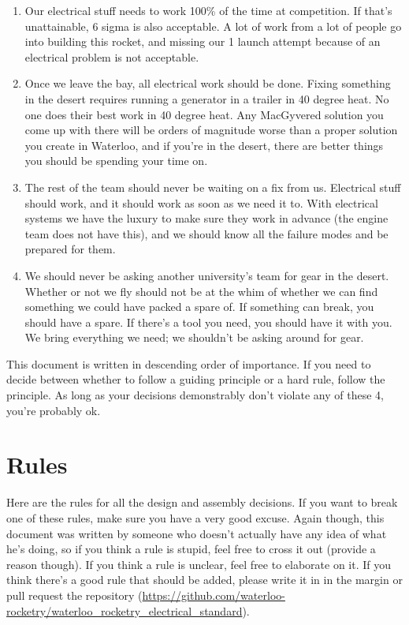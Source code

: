\documentclass{article}
\begin{document}
\begin{enumerate}
\item Our electrical stuff needs to work 100\% of the time at competition. If that's unattainable, 6 sigma is also acceptable. A lot of work from a lot of people go into building this rocket, and missing our 1 launch attempt because of an electrical problem is not acceptable.
\item Once we leave the bay, all electrical work should be done. Fixing something in the desert requires running a generator in a trailer in 40 degree heat. No one does their best work in 40 degree heat. Any MacGyvered solution you come up with there will be orders of magnitude worse than a proper solution you create in Waterloo, and if you're in the desert, there are better things you should be spending your time on.
\item The rest of the team should never be waiting on a fix from us. Electrical stuff should work, and it should work as soon as we need it to. With electrical systems we have the luxury to make sure they work in advance (the engine team does not have this), and we should know all the failure modes and be prepared for them. 
\item We should never be asking another university's team for gear in the desert. Whether or not we fly should not be at the whim of whether we can find something we could have packed a spare of. If something can break, you should have a spare. If there's a tool you need, you should have it with you. We bring everything we need; we shouldn't be asking around for gear.
\end{enumerate}
This document is written in descending order of importance. If you need to decide between whether to follow a guiding principle or a hard rule, follow the principle. As long as your decisions demonstrably don't violate any of these 4, you're probably ok.

\section{Rules}
Here are the rules for all the design and assembly decisions. If you want to break one of these rules, make sure you have a very good excuse. Again though, this document was written by someone who doesn't actually have any idea of what he's doing, so if you think a rule is stupid, feel free to cross it out (provide a reason though). If you think a rule is unclear, feel free to elaborate on it. If you think there's a good rule that should be added, please write it in in the margin or pull request the repository (\url{https://github.com/waterloo-rocketry/waterloo\_rocketry\_electrical\_standard}).
\end{document}
